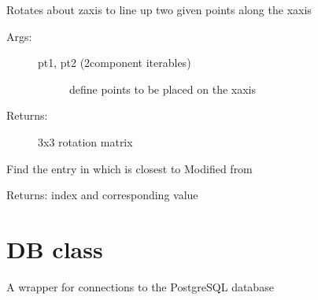 \documentclass[letterpaper,10pt,english]{sphinxmanual}
\begin{document}

\begin{fulllineitems}
\label{\detokenize{utilities:galaxy.utilities.z_rotation_matrix}}
Rotates about z\sphinxhyphen{}axis to line up two given points along the x\sphinxhyphen{}axis
\begin{description}
\item[{Args:}] \leavevmode\begin{description}
\item[{pt1, pt2 (2\sphinxhyphen{}component iterables)}] \leavevmode
define points to be placed on the  x\sphinxhyphen{}axis

\end{description}

\item[{Returns:}] \leavevmode
3x3 rotation matrix

\end{description}

\end{fulllineitems}


\begin{fulllineitems}
\label{\detokenize{utilities:galaxy.utilities.find_nearest}}
Find the entry in  which is closest to 
Modified from 

Returns: index and corresponding value

\end{fulllineitems}

\label{\detokenize{db:module-galaxy.db}}

\chapter{DB class}
\label{\detokenize{db:db-class}}\label{\detokenize{db::doc}}
A wrapper for connections to the PostgreSQL database
\end{document}
